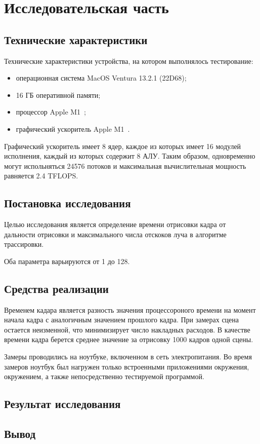 \chapter{Исследовательская часть}

\section{Технические характеристики}

Технические характеристики устройства, на котором выполнялось тестирование:
\begin{itemize}
    \item операционная система MacOS Ventura 13.2.1 (22D68);
    \item 16 ГБ оперативной памяти;
    \item процессор Apple M1~\cite{M1};
    \item графический ускоритель Apple M1~\cite{M1}.
\end{itemize}

Графический ускоритель имеет 8 ядер, каждое из которых имеет 16 модулей 
исполнения, каждый из которых содержит 8 АЛУ. Таким образом, 
одновременно могут испольняться 24576 потоков и максимальная вычислительная мощность
равняется 2.4 TFLOPS.

\section{Постановка исследования}

Целью исследования является определение времени отрисовки кадра 
от дальности отрисовки и максимального числа отскоков луча в алгоритме трассировки.

Оба параметра варьируются от 1 до 128.

\section{Средства реализации}

Временем кадара является разность значения процессороного времени на момент начала кадра с 
аналогичным значением прошлого кадра. При замерах сцена остается неизменной, что
минимизирует число накладных расходов. В качестве времени кадра берется
среднее значение за отрисовку 1000 кадров одной сцены.

Замеры проводились на ноутбуке, включенном в сеть 
электропитания. Во время замеров ноутбук был нагружен только 
встроенными приложениями окружения, окружением, а 
также непосредственно тестируемой программой.

\section{Результат исследования}

\section{Вывод}

